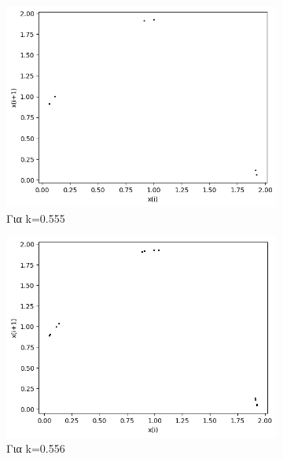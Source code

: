 \begin{figure}[h!]
	\centering
	
	\begin{subfigure}[b]{0.4\textwidth}
		\centering
		\includegraphics[width=\textwidth]{LateX images/graphs q03/g9}
		\caption{Για k=0.555}
		\label{f:k21}
	\end{subfigure}
	\hfill
	\begin{subfigure}[b]{0.4\textwidth}
		\centering
		\includegraphics[width=\textwidth]{LateX images/graphs q03/g10}
		\caption{Για k=0.556}
		\label{f:k22}
	\end{subfigure}
	\hfill
	\begin{subfigure}[b]{0.4\textwidth}
		\centering

\end{subfigure}
\end{figure}
